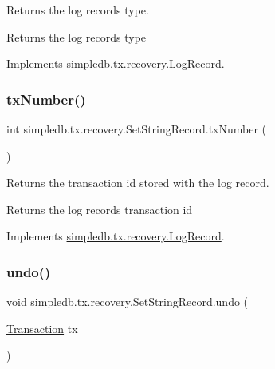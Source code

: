 Returns the log record\textquotesingle{}s type. \begin{DoxyReturn}{Returns}
the log record\textquotesingle{}s type 
\end{DoxyReturn}


Implements \hyperlink{interfacesimpledb_1_1tx_1_1recovery_1_1LogRecord_aa97a8907de4709c2b3596e8c9709a26c}{simpledb.\+tx.\+recovery.\+Log\+Record}.

\mbox{\label{classsimpledb_1_1tx_1_1recovery_1_1SetStringRecord_adcd0381963f274bf07aeb2e615ba6c8f}} 
\subsubsection{\texorpdfstring{tx\+Number()}{txNumber()}}
{\footnotesize\ttfamily int simpledb.\+tx.\+recovery.\+Set\+String\+Record.\+tx\+Number (\begin{DoxyParamCaption}{ }\end{DoxyParamCaption})\hspace{0.3cm}{\ttfamily [inline]}}

Returns the transaction id stored with the log record. \begin{DoxyReturn}{Returns}
the log record\textquotesingle{}s transaction id 
\end{DoxyReturn}


Implements \hyperlink{interfacesimpledb_1_1tx_1_1recovery_1_1LogRecord_a167f7406c18bf3367f1b83f6853870db}{simpledb.\+tx.\+recovery.\+Log\+Record}.

\mbox{\label{classsimpledb_1_1tx_1_1recovery_1_1SetStringRecord_a34e8c9a212d3dfcd8f36774271d8cb38}} 
\subsubsection{\texorpdfstring{undo()}{undo()}}
{\footnotesize\ttfamily void simpledb.\+tx.\+recovery.\+Set\+String\+Record.\+undo (\begin{DoxyParamCaption}\item[{\hyperlink{classsimpledb_1_1tx_1_1Transaction}{Transaction}}]{tx }\end{DoxyParamCaption})\hspace{0.3cm}{\ttfamily [inline]}}

